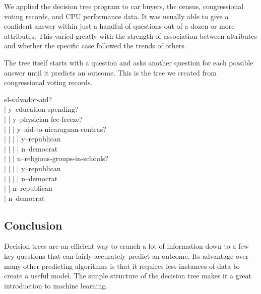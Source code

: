 \documentclass[11pt,a4paper]{article}
\begin{document}
We applied the decision tree program to car buyers, the census, congressional voting records, and CPU performance data. It was usually able to give a confident answer within just a handful of questions out of a dozen or more attributes. This varied greatly with the strength of association between attributes and whether the specific case followed the trends of others.

The tree itself starts with a question and asks another question for each possible answer until it predicts an outcome. This is the tree we created from congressional voting records.

{
\ttfamily
el-salvador-aid? \\
| y--education-spending? \\
| | y--physician-fee-freeze? \\
| | | y--aid-to-nicaraguan-contras? \\
| | | | y--republican \\
| | | | n--democrat \\
| | | n--religious-groups-in-schools? \\
| | | | y--republican \\
| | | | n--democrat \\
| | n--republican \\
| n--democrat
}

\subsection{Conclusion}
\label{DecisionTrees:Conclusion}

Decision trees are an efficient way to crunch a lot of information down to a few key questions that can fairly accurately predict an outcome. Its advantage over many other predicting algorithms is that it requires less instances of data to create a useful model. The simple structure of the decision tree makes it a great introduction to machine learning.
\end{document}
